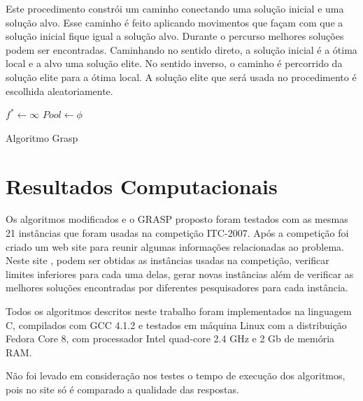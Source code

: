 \documentclass[11pt]{article}
\begin{document}
Este procedimento constrói um caminho conectando uma solução inicial e uma solução alvo. Esse caminho é feito aplicando movimentos que façam com que a solução inicial fique igual a solução alvo. Durante o percurso melhores soluções podem ser encontradas. Caminhando no sentido direto, a solução inicial é a ótima local e a alvo uma solução elite. No sentido inverso, o caminho é percorrido da solução elite para a ótima local. A solução elite que será usada no procedimento é escolhida aleatoriamente.

\begin{algorithm}[H]
\SetAlgoLined
{}

$f^{*} \leftarrow \infty $ \;
$Pool \leftarrow \phi $ \;
\caption{Algoritmo Grasp}
\end{algorithm}


\section{Resultados Computacionais}
\label{sec:resultados}

Os algoritmos modificados e o GRASP proposto foram testados com as mesmas 21 instâncias que foram usadas na competição ITC-2007. Após a competição foi criado um web site para reunir algumas informações relacionadas ao problema. Neste site \cite{ctt}, podem ser obtidas as instâncias usadas na competição, verificar limites inferiores para cada uma delas, gerar novas instâncias além de verificar as melhores soluções encontradas por diferentes pesquisadores para cada instância.

Todos os algoritmos descritos neste trabalho foram implementados na linguagem C, compilados com GCC 4.1.2 e testados em máquina Linux com a distribuição Fedora Core 8, com processador Intel quad-core 2.4 GHz e 2 Gb de memória RAM.

Não foi levado em consideração nos testes o tempo de execução dos algoritmos, pois no site \cite{ctt} só é comparado a qualidade das respostas.
\end{document}
